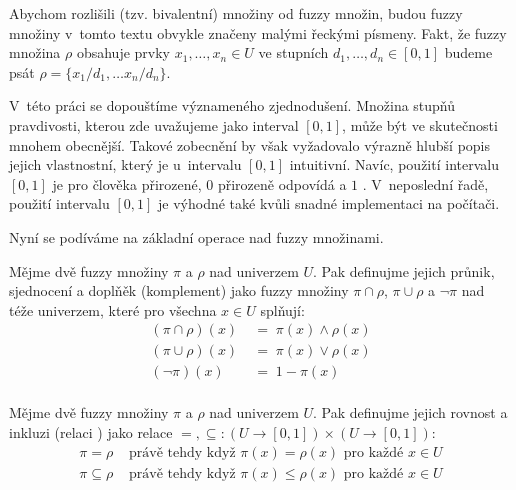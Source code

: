 \begin{notation*}
 Abychom rozlišili  (tzv. bivalentní) množiny od fuzzy množin, budou fuzzy množiny v~tomto textu obvykle značeny malými řeckými písmeny. Fakt, že fuzzy množina $\rho$ obsahuje prvky $x_1, \dots, x_n \in U$ ve stupních $d_1, \dots, d_n \in [0,1]$ budeme psát $\rho = \{ x_1 / d_1, \dots x_n / d_n \}$. 
\end{notation*}

V~této práci se dopouštíme význameného zjednodušení. Množina stupňů pravdivosti, kterou zde uvažujeme jako interval $[0, 1]$, může být ve skutečnosti mnohem obecnější. Takové zobecnění by však vyžadovalo výrazně hlubší popis jejich vlastnostní, který je u~intervalu $[0, 1]$ intuitivní. Navíc, použití intervalu $[0, 1]$ je pro člověka přirozené, $0$ přirozeně odpovídá  a $1$ . V~neposlední řadě, použití intervalu $[0, 1]$ je výhodné také kvůli snadné implementaci na počítači.


Nyní se podíváme na základní operace nad fuzzy množinami.

\begin{definition}
 Mějme dvě fuzzy množiny $\pi$ a $\rho$ nad univerzem $U$. Pak definujme jejich průnik, sjednocení a doplňěk (komplement) jako fuzzy množiny $\pi \cap \rho$, $\pi \cup \rho$ a $\neg \pi$ nad téže univerzem, které pro všechna $x \in U$ splňují:
 \begin{align*}
  (\pi \cap \rho)(x) 	\; &= \; \pi(x) \wedge \rho(x) \\
  (\pi \cup \rho)(x) 	\; &= \; \pi(x) \vee \rho(x) \\
  (\neg \pi)(x) 	\; &= \; 1 - \pi(x) \\
 \end{align*}
\end{definition}

\begin{definition}
 Mějme dvě fuzzy množiny $\pi$ a $\rho$ nad univerzem $U$. Pak definujme jejich rovnost a inkluzi (relaci ) jako relace $=,\subseteq: (U \rightarrow [0,1]) \times (U \rightarrow [0,1])$:
 \begin{align*}
  \pi = \rho 		&\text{ právě tehdy když } \pi(x) = \rho(x) 	\text{ pro každé $x \in U$}	\\
  \pi \subseteq \rho 	&\text{ právě tehdy když } \pi(x) \leq \rho(x) 	\text{ pro každé $x \in U$}	\\	
 \end{align*}
\end{definition}

